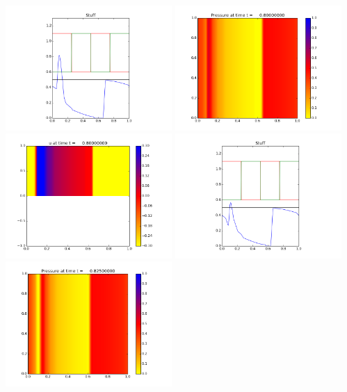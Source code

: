 \documentclass[11pt]{article}
\begin{document}
\vskip 10pt 
\includegraphics[width=0.475\textwidth]{frame0031fig3.png}
\vskip 10pt 
\includegraphics[width=0.475\textwidth]{frame0032fig0.png}
\includegraphics[width=0.475\textwidth]{frame0032fig1.png}
\vskip 10pt 
\includegraphics[width=0.475\textwidth]{frame0032fig3.png}
\vskip 10pt 
\includegraphics[width=0.475\textwidth]{frame0033fig0.png}
\end{document}
